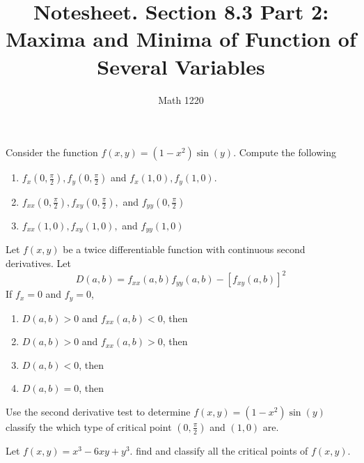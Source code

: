 \documentclass[12pt, a4paper]{article}
\author{Math 1220}
\title{Notesheet. Section 8.3 Part 2: Maxima and Minima of Function of
  Several Variables}
\date{}
\begin{document}
\maketitle
\nameline
\vspace{-0.3in}
\begin{ex}
  Consider the function \(f(x,y) = (1-x^2) \sin(y)\). Compute the
  following
  \begin{enumerate}
  \item \(f_x(0,\frac{\pi}{2}), f_y(0,\frac{\pi}{2})\) and \(f_x(1,0),f_y(1,0)\).
    \vspace{0.75in}
  \item \(f_{xx}(0,\frac{\pi}{2}), f_{xy}(0,\frac{\pi}{2}), \) and \(f_{yy}(0,\frac{\pi}{2})\)
    \vspace{0.75in}
  \item \(f_{xx}(1,0), f_{xy}(1,0),\) and \(f_{yy}(1,0)\)
  \end{enumerate}
\end{ex}
\vspace{-1.5in}
\begin{thrm}
  Let \(f(x,y)\) be a twice differentiable function with continuous
  second derivatives. Let \[
    D(a,b) = f_{xx}(a,b)f_{yy}(a,b) - [f_{xy}(a,b)]^2
  \]
  If \(f_x = 0\) and \(f_y = 0\),
  \begin{enumerate}[label=(\alph*)]
  \item \(D(a,b) > 0\) and \(f_{xx}(a,b) < 0\), then
    \vspace{0.075in}
  \item \(D(a,b) > 0\) and \(f_{xx}(a,b) > 0\), then
    \vspace{0.075in}
  \item \(D(a,b) < 0\), then
    \vspace{0.075in}
  \item \(D(a,b) = 0\), then
  \end{enumerate}
\end{thrm}
\vspace{-0.75in}
\begin{ex}
  Use the second derivative test to determine \(f(x,y) =
  (1-x^2)\sin(y)\) classify the which type of critical point \((0,\frac{\pi}{2})\) and
  \((1,0)\) are.
\end{ex}
\vspace{-0.75in}
\begin{ex}
  Let \(f(x,y) = x^3-6xy+y^3\). find and classify all the critical
  points of \(f(x,y)\).
\end{ex}
\end{document}
